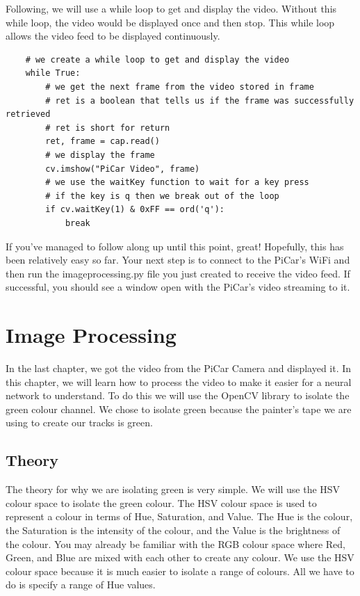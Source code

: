 \documentclass[11pt]{report}
\begin{document}
Following, we will use a while loop to get and display the video. Without this while loop, the video would be displayed once and then stop. This while loop allows the video feed to be displayed continuously.

\begin{verbatim}
    # we create a while loop to get and display the video
    while True:
        # we get the next frame from the video stored in frame
        # ret is a boolean that tells us if the frame was successfully retrieved
        # ret is short for return
        ret, frame = cap.read()
        # we display the frame
        cv.imshow("PiCar Video", frame)
        # we use the waitKey function to wait for a key press
        # if the key is q then we break out of the loop
        if cv.waitKey(1) & 0xFF == ord('q'):
            break
\end{verbatim}

If you’ve managed to follow along up until this point, great! Hopefully, this has been relatively easy so far.
Your next step is to connect to the PiCar's WiFi and then run the imageprocessing.py file you just created to receive the video feed. If successful, you should see a window open with the PiCar's video streaming to it.

\chapter{Image Processing}
In the last chapter, we got the video from the PiCar Camera and displayed it. In this chapter, we will learn how to process the video to make it easier for a neural network to understand. To do this we will use the OpenCV library to isolate the green colour channel. We chose to isolate green because the painter's tape we are using to create our tracks is green. 

\pagebreak

\section{Theory}
The theory for why we are isolating green is very simple. We will use the HSV colour space to isolate the green colour. The HSV colour space is used to represent a colour in terms of Hue, Saturation, and Value. The Hue is the colour, the Saturation is the intensity of the colour, and the Value is the brightness of the colour. You may already be familiar with the RGB colour space where Red, Green, and Blue are mixed with each other to create any colour. We use the HSV colour space because it is much easier to isolate a range of colours. All we have to do is specify a range of Hue values.
\end{document}
